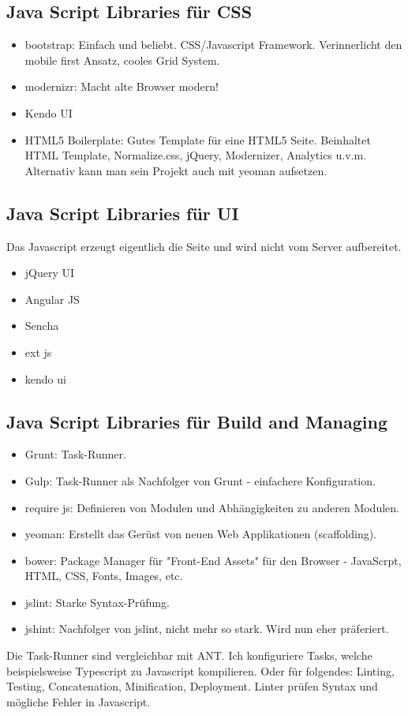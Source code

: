 \subsection{Java Script Libraries für CSS}
\begin{itemize}
	\item bootstrap: Einfach und beliebt. CSS/Javascript Framework. Verinnerlicht den mobile first Ansatz, cooles Grid System.
	\item modernizr: Macht alte Browser modern!
	\item Kendo UI
	\item HTML5 Boilerplate: Gutes Template für eine HTML5 Seite. Beinhaltet HTML Template, Normalize.css, jQuery, Modernizer, Analytics u.v.m. Alternativ kann man sein Projekt auch mit yeoman aufsetzen.
\end{itemize}

\subsection{Java Script Libraries für UI}
Das Javascript erzeugt eigentlich die Seite und wird nicht vom Server aufbereitet.
\begin{itemize}
	\item jQuery UI
	\item Angular JS
	\item Sencha
	\item ext js
	\item kendo ui
\end{itemize}

\subsection{Java Script Libraries für Build and Managing}
\begin{itemize}
	\item Grunt: Task-Runner.
	\item Gulp: Task-Runner als Nachfolger von Grunt - einfachere Konfiguration.
	\item require js: Definieren von Modulen und Abhängigkeiten zu anderen Modulen.
	\item yeoman: Erstellt das Gerüst von neuen Web Applikationen (scaffolding).
	\item bower: Package Manager für "Front-End Assets" für den Browser - JavaScrpt, HTML, CSS, Fonts, Images, etc. 
	\item jslint: Starke Syntax-Prüfung.
	\item jshint: Nachfolger von jslint, nicht mehr so stark. Wird nun eher präferiert.
\end{itemize}
Die Task-Runner sind vergleichbar mit ANT. Ich konfiguriere Tasks, welche beispielsweise Typescript zu Javascript kompilieren. Oder für folgendes: Linting, Testing, Concatenation,
Minification, Deployment. Linter prüfen Syntax und mögliche Fehler in Javascript.

